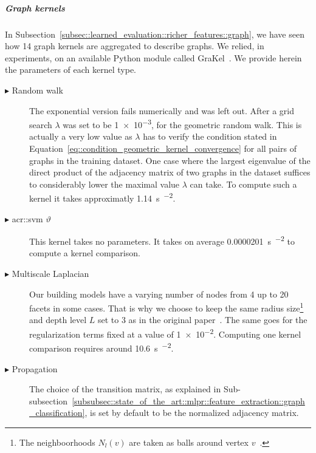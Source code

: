                 \subparagraph{Graph kernels}
                    In Subsection~\ref{subsec::learned_evaluation::richer_features::graph}, we have seen how 14 graph kernels are aggregated to describe graphs.
                    We relied, in experiments, on an available Python module called GraKel~\parencite{siglidis2018grakel}.
                    We provide herein the parameters of each kernel type.
                    \begin{description}
                        \item[\(\blacktriangleright\) Random walk] The exponential version fails numerically and was left out.
                                    After a grid search \(\lambda\) was set to be \num{1e-3}, for the geometric random walk.
                                    This is actually a very low value as \(\lambda\) has to verify the condition stated in Equation~\ref{eq::condition_geometric_kernel_convergence} for all pairs of graphs in the training dataset.
                                    One case where the largest eigenvalue of the direct product of the adjacency matrix of two graphs in the dataset suffices to considerably lower the maximal value \(\lambda\) can take.
                                    To compute such a kernel it takes approximatly \SI{1.14}{\s\per\building\squared}.
                        \item[\(\blacktriangleright\) \gls{acr::svm} \(\vartheta\)] This kernel takes no parameters.
                                    It takes on average \SI{0.0000201}{\s\per\building\squared} to compute a kernel comparison.
                        \item[\(\blacktriangleright\) Multiscale Laplacian] Our building models have a varying number of nodes from 4 up to 20 facets in some cases.
                                    That is why we choose to keep the same radius size\footnote{The neighboorhoods \(N_l(v)\) are taken as balls around vertex \(v\)~\parencite{kondor2016multiscale}.} and depth level \(L\) set to 3 as in the original paper~\parencite{kondor2016multiscale}.
                                    The same goes for the regularization terms fixed at a value of \num{1e-2}.
                                    Computing one kernel comparison requires around \SI{10.6}{\s\per\building\squared}.
                        \item[\(\blacktriangleright\) Propagation] The choice of the transition matrix, as explained in Sub-subsection~\ref{subsubsec::state_of_the_art::mlpr::feature_extraction::graph_classification}, is set by default to be the normalized adjacency matrix.

\end{description}
